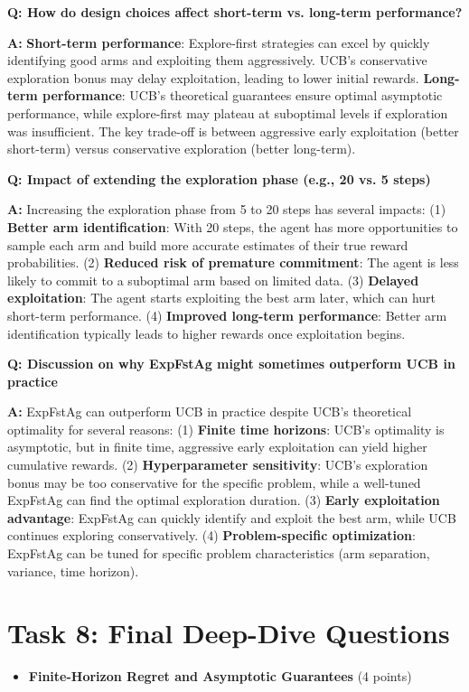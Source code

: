 \documentclass[12pt]{article}
\begin{document}
{{{\textbf{Q: How do design choices affect short-term vs. long-term performance?}

\textbf{A:} \textbf{Short-term performance}: Explore-first strategies can excel by quickly identifying good arms and exploiting them aggressively. UCB's conservative exploration bonus may delay exploitation, leading to lower initial rewards. \textbf{Long-term performance}: UCB's theoretical guarantees ensure optimal asymptotic performance, while explore-first may plateau at suboptimal levels if exploration was insufficient. The key trade-off is between aggressive early exploitation (better short-term) versus conservative exploration (better long-term).

\textbf{Q: Impact of extending the exploration phase (e.g., 20 vs. 5 steps)}

\textbf{A:} Increasing the exploration phase from 5 to 20 steps has several impacts: (1) \textbf{Better arm identification}: With 20 steps, the agent has more opportunities to sample each arm and build more accurate estimates of their true reward probabilities. (2) \textbf{Reduced risk of premature commitment}: The agent is less likely to commit to a suboptimal arm based on limited data. (3) \textbf{Delayed exploitation}: The agent starts exploiting the best arm later, which can hurt short-term performance. (4) \textbf{Improved long-term performance}: Better arm identification typically leads to higher rewards once exploitation begins.

\textbf{Q: Discussion on why ExpFstAg might sometimes outperform UCB in practice}

\textbf{A:} ExpFstAg can outperform UCB in practice despite UCB's theoretical optimality for several reasons: (1) \textbf{Finite time horizons}: UCB's optimality is asymptotic, but in finite time, aggressive early exploitation can yield higher cumulative rewards. (2) \textbf{Hyperparameter sensitivity}: UCB's exploration bonus may be too conservative for the specific problem, while a well-tuned ExpFstAg can find the optimal exploration duration. (3) \textbf{Early exploitation advantage}: ExpFstAg can quickly identify and exploit the best arm, while UCB continues exploring conservatively. (4) \textbf{Problem-specific optimization}: ExpFstAg can be tuned for specific problem characteristics (arm separation, variance, time horizon).

\section{Task 8: Final Deep-Dive Questions}
\begin{itemize}[noitemsep]
    \item \textbf{Finite-Horizon Regret and Asymptotic Guarantees} (4 points)
    

\end{itemize}}}}
\end{document}
